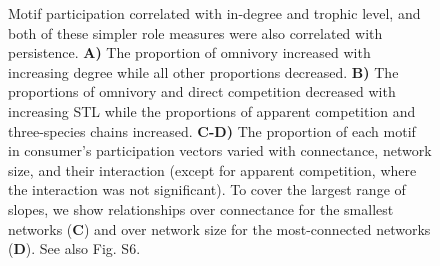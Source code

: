 \documentclass[12pt]{article}
\begin{document}
\begin{spacing}{1.0}
    \begin{figure}[hb!]
        \centering
        \caption{Motif participation correlated with in-degree and trophic level, and both of these simpler role measures were also correlated with persistence. \textbf{A)} The proportion of omnivory increased with increasing degree while all other proportions decreased. \textbf{B)} The proportions of omnivory and direct competition decreased with increasing STL while the proportions of apparent competition and three-species chains increased. \textbf{C-D)} The proportion of each motif in consumer's participation vectors varied with connectance, network size, and their interaction (except for apparent competition, where the interaction was not significant). To cover the largest range of slopes, we show relationships over connectance for the smallest networks (\textbf{C}) and over network size for the most-connected networks (\textbf{D}). See also Fig. S6.}
        \label{fig:motifs_vs_TL_and_deg}
    \end{figure}        

\end{spacing}
\end{document}
